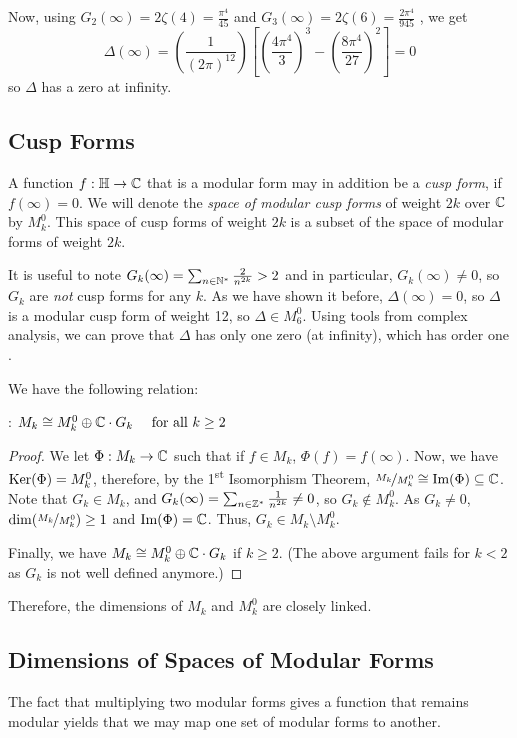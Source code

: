 Now, using 
$
G_2(\infty) = 2\zeta(4) = \frac{\pi^4}{45}
$
 and 
$
G_3(\infty) = 2\zeta(6) = \frac{2\pi^4}{945}
$
, we get 
$$
\Delta(\infty) = \left( \frac{1}{(2\pi)^{12}} \right) \left[ \left( \frac{4\pi^4}{3} \right)^3 - \left( \frac{8\pi^4}{27} \right)^2 \right] =  0
$$
so $\Delta$ has a zero at infinity.


\subsection{Cusp Forms}
A function $f:\mathbb{H} \to \mathbb{C}$ that is a modular form may in addition be a \textit{cusp form}, if $f(\infty)=0$.
We will denote the \textit{space of modular cusp forms} of weight $2k$ over $\mathbb{C}$ by $M_k^0$. This space of cusp forms of weight $2k$ is a subset of the space of modular forms of weight $2k$.

It is useful to note $G_k(\infty) = \sum_{n \in \mathbb{N}^*} \frac{2}{n^{2k}} > 2$ and in particular, $G_k(\infty) \neq 0$, so $G_k$ are \textit{not} cusp forms for any $k$.
As we have shown it before, $\Delta(\infty)=0$, so $\Delta$ is a modular cusp form of weight 12, so $\Delta \in M_6^0$.
Using tools from complex analysis, we can prove that $\Delta$ has only one zero (at infinity), which has order one \cite[p.88]{CourseInArithmetic}.

We have the following relation:
\begin{theorem}
	\cite[p.88]{CourseInArithmetic}:
    $M_k \cong M_k^0 \oplus \mathbb{C} \cdot G_k \quad \text{ for all } k \geq 2$
\end{theorem}
\begin{proof}
    We let $\Phi:M_k \to \mathbb{C}$ such that if $f \in M_k$, $\Phi(f) = f(\infty)$.
    Now, we have $\text{Ker}(\Phi) = M_k^0$, therefore, by the 1\textsuperscript{st} Isomorphism Theorem, $\nicefrac{M_k}{M_k^0} \cong \text{Im}(\Phi) \subseteq \mathbb{C}$.
    Note that $G_k \in M_k$, and $G_k(\infty) = \sum_{n \in \mathbb{Z}^*} \frac{1}{n^{2k}} \neq 0$, so $G_k \not\in M_k^0$.
    As $G_k \neq 0$, $\dim(\nicefrac{M_k}{M_k^0}) \geq 1$ and $\text{Im}(\Phi) = \mathbb{C}$.
    Thus, $G_k \in M_k \setminus M_k^0$.
    
    Finally, we have $M_k \cong M_k^0 \oplus \mathbb{C} \cdot G_k$ if $k \geq 2$.
    (The above argument fails for $k<2$ as $G_k$ is not well defined anymore.)
\end{proof}
Therefore, the dimensions of $M_k$ and $M_k^0$ are closely linked.



\subsection{Dimensions of Spaces of Modular Forms}
The fact that multiplying two modular forms gives a function that remains modular yields that we may map one set of modular forms to another.

